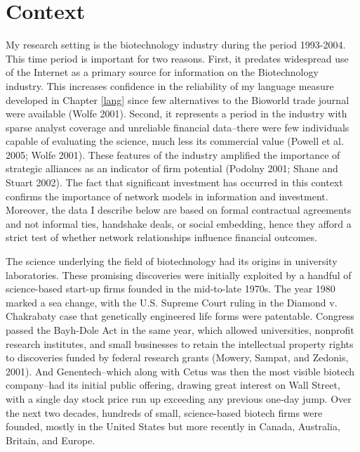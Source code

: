 \section{Context}

My research setting is the biotechnology industry during the period 1993-2004. This time period is important for two reasons. First, it predates widespread use of the Internet as a primary source for information on the Biotechnology industry. This increases confidence in the reliability of my language measure developed in Chapter \ref{lang} since few alternatives to the Bioworld trade journal were available (Wolfe 2001). Second, it represents a period in the industry with sparse analyst coverage and unreliable financial data--there were few individuals capable of evaluating the science, much less its commercial value (Powell et al. 2005; Wolfe 2001). These features of the industry amplified the importance of strategic alliances as an indicator of firm potential (Podolny 2001; Shane and Stuart 2002). The fact that significant investment has occurred in this context confirms the importance of network models in information and investment. Moreover, the data I describe below are based on formal contractual agreements and not informal ties, handshake deals, or social embedding, hence they afford a strict test of whether network relationships influence financial outcomes.  

The science underlying the field of biotechnology had its origins in university laboratories. These promising discoveries were initially exploited by a handful of science-based start-up firms founded in the mid-to-late 1970s. The year 1980 marked a sea change, with the U.S. Supreme Court ruling in the Diamond v. Chakrabaty case that genetically engineered life forms were patentable. Congress passed the Bayh-Dole Act in the same year, which allowed universities, nonprofit research institutes, and small businesses to retain the intellectual property rights to discoveries funded by federal research grants (Mowery, Sampat, and Zedonis, 2001). And Genentech--which along with Cetus was then the most visible biotech company--had its initial public offering, drawing great interest on Wall Street, with a single day stock price run up exceeding any previous one-day jump. Over the next two decades, hundreds of small, science-based biotech firms were founded, mostly in the United States but more recently in Canada, Australia, Britain, and Europe.

